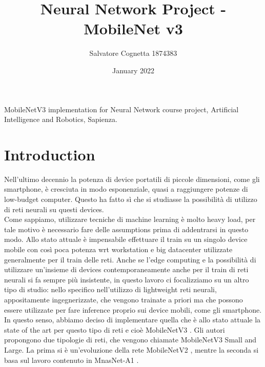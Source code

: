 \documentclass[12pt, letterpaper, twoside]{article}
\title{Neural Network Project - MobileNet v3}
\author{Salvatore Cognetta 1874383}
\date{January 2022}
\begin{document}
\begin{titlepage}
\maketitle
\end{titlepage}

\clearpage
\thispagestyle{empty}
\vspace*{\fill}
MobileNetV3 implementation for Neural Network course project, Artificial Intelligence and Robotics, Sapienza.
\vspace*{\fill}
\clearpage


\tableofcontents

\clearpage
    
\clearpage
\section{Introduction}
Nell'ultimo decennio la potenza di device portatili di piccole dimensioni, come gli smartphone, è cresciuta in modo esponenziale, quasi a raggiungere potenze di low-budget computer. Questo ha fatto sì che si studiasse la possibilità di utilizzo di reti neurali su questi devices. \\
Come sappiamo, utilizzare tecniche di machine learning è molto heavy load, per tale motivo è necessario fare delle assumptions prima di addentrarsi in questo modo. Allo stato attuale è impensabile effettuare il train su un singolo device mobile con così poca potenza wrt workstation e big datacenter utilizzate generalmente per il train delle reti. Anche se l'edge computing e la possibilità di utilizzare un'insieme di devices contemporaneamente anche per il train di reti neurali si fa sempre più insistente, in questo lavoro ci focalizziamo su un altro tipo di studio: nello specifico nell'utilizzo di lightweight reti neurali, appositamente ingegnerizzate, che vengono trainate a priori ma che possono essere utilizzate per fare inference proprio sui device mobili, come gli smartphone. \\
In questo senso, abbiamo deciso di implementare quella che è allo stato attuale la state of the art per questo tipo di reti e cioè MobileNetV3 \cite{howard2019searching}. Gli autori propongono due tipologie di reti, che vengono chiamate MobileNetV3 Small and Large. La prima si è un'evoluzione della rete MobileNetV2 \cite{sandler2019mobilenetv2}, mentre la seconda si basa sul lavoro contenuto in MnasNet-A1 \cite{tan2019mnasnet}. \\
\end{document}
